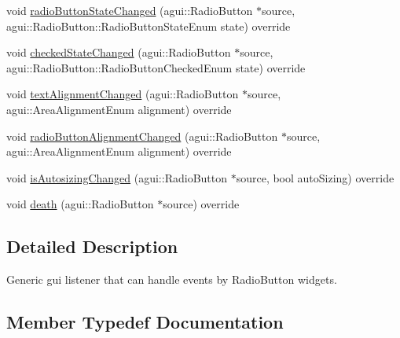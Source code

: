 \begin{DoxyCompactItemize}
\item 
void \mbox{\hyperlink{classec_1_1_generic_radio_button_listener_a6bf0c1bac860be217d9ca235613263b7}{radio\+Button\+State\+Changed}} (agui\+::\+Radio\+Button $\ast$source, agui\+::\+Radio\+Button\+::\+Radio\+Button\+State\+Enum state) override
\item 
void \mbox{\hyperlink{classec_1_1_generic_radio_button_listener_aa63b18d180a67d43d15311b351cbafb0}{checked\+State\+Changed}} (agui\+::\+Radio\+Button $\ast$source, agui\+::\+Radio\+Button\+::\+Radio\+Button\+Checked\+Enum state) override
\item 
void \mbox{\hyperlink{classec_1_1_generic_radio_button_listener_a324705c5155f71e01104399b12a95b8f}{text\+Alignment\+Changed}} (agui\+::\+Radio\+Button $\ast$source, agui\+::\+Area\+Alignment\+Enum alignment) override
\item 
void \mbox{\hyperlink{classec_1_1_generic_radio_button_listener_ac325d7d75fc038078368ab34addb1793}{radio\+Button\+Alignment\+Changed}} (agui\+::\+Radio\+Button $\ast$source, agui\+::\+Area\+Alignment\+Enum alignment) override
\item 
void \mbox{\hyperlink{classec_1_1_generic_radio_button_listener_a41958342697556ad6aad28d03bbd1d51}{is\+Autosizing\+Changed}} (agui\+::\+Radio\+Button $\ast$source, bool auto\+Sizing) override
\item 
void \mbox{\hyperlink{classec_1_1_generic_radio_button_listener_ab5fee70ab046379a87fd047a77de64df}{death}} (agui\+::\+Radio\+Button $\ast$source) override
\end{DoxyCompactItemize}


\subsection{Detailed Description}
Generic gui listener that can handle events by Radio\+Button widgets. 

\subsection{Member Typedef Documentation}
\mbox{\label{classec_1_1_generic_radio_button_listener_aa2ce6fc7dec8cfb263608c59f6eb338f}} 
